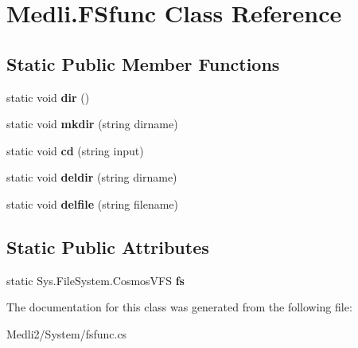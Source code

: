 \hypertarget{class_medli_1_1_f_sfunc}{}\section{Medli.\+F\+Sfunc Class Reference}
\label{class_medli_1_1_f_sfunc}
\subsection*{Static Public Member Functions}
\begin{DoxyCompactItemize}
\item 
\mbox{\label{class_medli_1_1_f_sfunc_a1c20949a22ca2f9f87e6173a1e33f2f9}} 
static void {\bfseries dir} ()
\item 
\mbox{\label{class_medli_1_1_f_sfunc_a54ecdd4c07495a1ce3306e5bed21b161}} 
static void {\bfseries mkdir} (string dirname)
\item 
\mbox{\label{class_medli_1_1_f_sfunc_adc8abbc2bec25588d36043cdbf8070de}} 
static void {\bfseries cd} (string input)
\item 
\mbox{\label{class_medli_1_1_f_sfunc_a42cb4868d8735d56b6afe410cbe2155f}} 
static void {\bfseries deldir} (string dirname)
\item 
\mbox{\label{class_medli_1_1_f_sfunc_a183f0f0ef25e5b6bdd664852754a428c}} 
static void {\bfseries delfile} (string filename)
\end{DoxyCompactItemize}
\subsection*{Static Public Attributes}
\begin{DoxyCompactItemize}
\item 
\mbox{\label{class_medli_1_1_f_sfunc_a8e035badec553c3e9170390ef3cee0b1}} 
static Sys.\+File\+System.\+Cosmos\+V\+FS {\bfseries fs}
\end{DoxyCompactItemize}


The documentation for this class was generated from the following file\+:\begin{DoxyCompactItemize}
\item 
Medli2/\+System/fsfunc.\+cs\end{DoxyCompactItemize}
